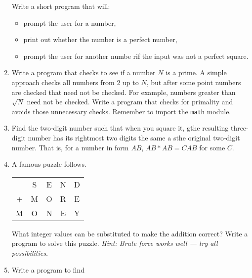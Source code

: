 \documentclass[14pt]{extarticle}
\begin{document}
\begin{enumerate}
	Write a short program that will:
	\begin{itemize}
		\item prompt the user for a number,
		\item print out whether the number is a perfect number,
		\item prompt the user for another numbe rif the input was not a perfect square.
	\end{itemize}
	\item Write a program that checks to see if a  number $N$ is a prime. A simple approach checks all numbers from 2 up to $N$, but after some point numbers are checked that need not be checked. For example, numbers greater than $\sqrt{N}$ need not be checked. Write a program that checks for primality and avoids those unnecessary checks. Remember to import the \texttt{math} module.
	\item Find the two-digit number such that when you square it, gthe resulting three-digit number has its rightmost two digits the same a sthe original two-digit number. That is, for a number in form $AB$, $AB*AB=CAB$ for some $C$.
	\item A famous puzzle follows.
	\begin{center}
		\begin{tabular}{ccccc}
			&S&E&N&D \\
		+	&M&O&R&E \\ \hline
		M	&O&N&E&Y
		\end{tabular}
	\end{center}
	What integer values can be substituted to make the addition correct? Write a program to solve this puzzle. \emph{Hint: Brute force works well --- try all possibilities.}
	\item Write a program to find 
\end{enumerate}
\end{document}
